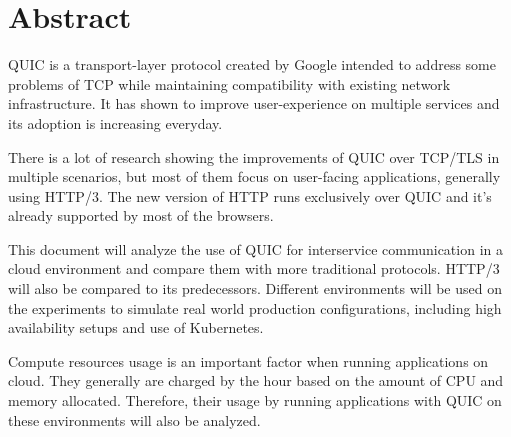\section*{Abstract}

QUIC is a transport-layer protocol created by Google intended to address some problems of TCP while maintaining compatibility with existing network infrastructure. It has shown to improve user-experience on multiple services and its adoption is increasing everyday.

There is a lot of research showing the improvements of QUIC over TCP/TLS in multiple scenarios, but most of them focus on user-facing applications, generally using HTTP/3. The new version of HTTP runs exclusively over QUIC and it’s already supported by most of the browsers.

This document will analyze the use of QUIC for interservice communication in a cloud environment and compare them with more traditional protocols. HTTP/3 will also be compared to its predecessors. Different environments will be used on the experiments to simulate real world production configurations, including high availability setups and use of Kubernetes.

Compute resources usage is an important factor when running applications on cloud. They generally are charged by the hour based on the amount of CPU and memory allocated. Therefore, their usage by running applications with QUIC on these environments will also be analyzed.
